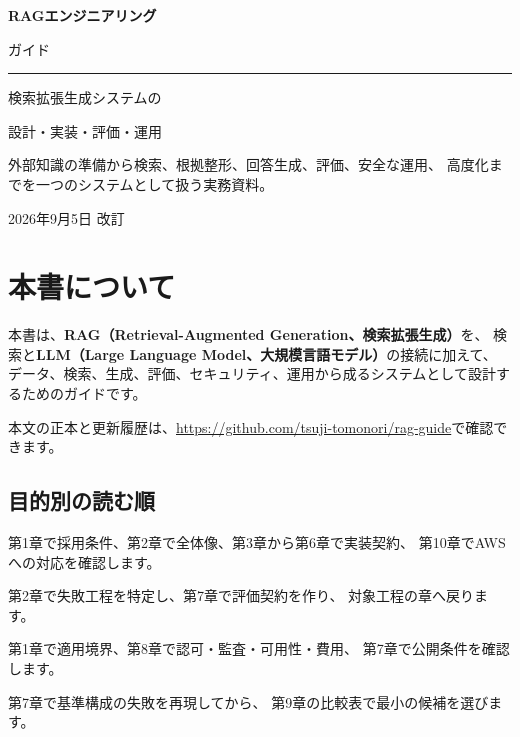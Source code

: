 \documentclass[a4paper,11pt,openany]{ltjsbook}
\begin{document}
\frontmatter
\begin{titlepage}
  \thispagestyle{empty}
  \vspace*{34mm}
  {\sffamily\bfseries\fontsize{26}{36}\selectfont
    RAGエンジニアリング\par
    ガイド\par}
  \vspace{12mm}
  \noindent\rule{\linewidth}{1.1pt}
  \vspace{10mm}
  {\Large\sffamily 検索拡張生成システムの\par
    設計・実装・評価・運用\par}
  \vfill
  \begin{minipage}{0.82\linewidth}
    \small
    外部知識の準備から検索、根拠整形、回答生成、評価、安全な運用、
    高度化までを一つのシステムとして扱う実務資料。
  \end{minipage}\par
  \vspace{18mm}
  {\sffamily 2026年9月5日 改訂\par}
\end{titlepage}

\chapter*{本書について}
本書は、\textbf{RAG（Retrieval-Augmented Generation、検索拡張生成）}を、
検索と\textbf{LLM（Large Language Model、大規模言語モデル）}の接続に加えて、
データ、検索、生成、評価、セキュリティ、運用から成るシステムとして設計するためのガイドです。


本文の正本と更新履歴は、\url{https://github.com/tsuji-tomonori/rag-guide}で確認できます。

\section*{目的別の読む順}
\begin{description}[leftmargin=9em,labelwidth=8em]
  \item[最初に作る] 第1章で採用条件、第2章で全体像、第3章から第6章で実装契約、
    第10章でAWSへの対応を確認します。
  \item[品質を改善する] 第2章で失敗工程を特定し、第7章で評価契約を作り、
    対象工程の章へ戻ります。
  \item[安全性を審査する] 第1章で適用境界、第8章で認可・監査・可用性・費用、
    第7章で公開条件を確認します。
  \item[高度化を検討する] 第7章で基準構成の失敗を再現してから、
    第9章の比較表で最小の候補を選びます。
\end{description}
\end{document}
